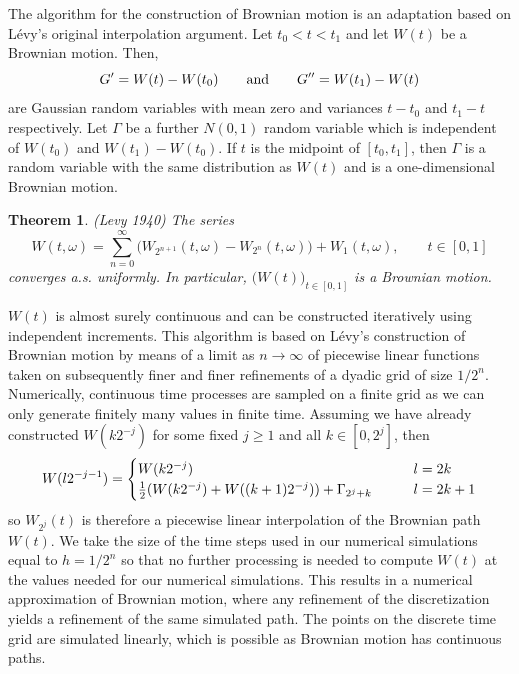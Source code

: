 \documentclass[master,tocprelim,12pt]{unrthesis}
\newtheorem{theorem}{Theorem}[chapter]
\theoremstyle{definition}
\def\wwords#1{\qquad\hbox{#1}\qquad}
\numberwithin{equation}{chapter}
\begin{document}
\begin{manuscript}
The algorithm for the construction of Brownian motion is an adaptation based on
L\'evy's original interpolation argument.
Let $t_0<t<t_1$ and let $W(t)$ be a Brownian motion. Then,
$$ 
G' = W(t) - W(t_0) \wwords{and} G'' = W(t_1) - W(t)
$$ 
are Gaussian random variables with mean zero and variances $t-t_0$ and $t_1-t$
respectively. Let $\Gamma$ be a further $N(0,1)$ random variable which is
independent of $W(t_0)$ and $W(t_1) - W(t_0)$. 
If $t$ is the midpoint of $[t_0,
t_1]$, then $\Gamma$ is a random variable with the same distribution as
$W(t)$ and is a one-dimensional Brownian motion. 
\begin{theorem}\label{levy}(Levy 1940)
    The series 
    $$
    W(t, \omega) = \displaystyle\sum_{n=0}^\infty \big(W_{2^{n+1}}(t,\omega) -
    W_{2^{n}}(t, \omega)\big) + W_1(t,\omega), \qquad t\in[0,1]
    $$
    converges a.s. uniformly. In particular, $\big(W(t)\big)_{t\in[0,1]}$ is a
    Brownian motion.
\end{theorem}
$W(t)$ is almost surely continuous and can be constructed
iteratively using independent increments.
This algorithm is based on L\'evy's construction of Brownian motion
by means of a limit as $n\to\infty$ of piecewise linear functions 
taken on subsequently finer and finer refinements of a dyadic grid
of size $1/2^n$.
Numerically, continuous time processes are sampled 
on a finite grid as we can only generate finitely many values in
finite time.
Assuming we have already constructed $W(k2^{-j})$ for some fixed $j\ge 1$ and all $k \in [0,2^j]$, 
then
$$
    W(l2^{-j-1}) = \begin{cases}
                        W(k2^{-j}) \qquad &l = 2k\\
                        \textstyle{1\over 2}(W(k2^{-j}) +
                        W((k+1)2^{-j})) + \Gamma_{2^j +k} \qquad &l = 2k+1\\
                   \end{cases}
$$
so $W_{2^j}(t)$ is therefore a piecewise linear interpolation of the Brownian path
$W(t)$.
We take the size of the time steps used in our
numerical simulations equal to $h=1/2^n$ so that no further 
processing is needed to compute $W(t)$ at the values needed
for our numerical simulations.
This results in a numerical approximation of Brownian motion,
where any refinement of the discretization yields a refinement of the
same simulated path.  The points on the discrete time grid are simulated
linearly, which is possible as Brownian motion has continuous paths.


\end{manuscript}
\end{document}
